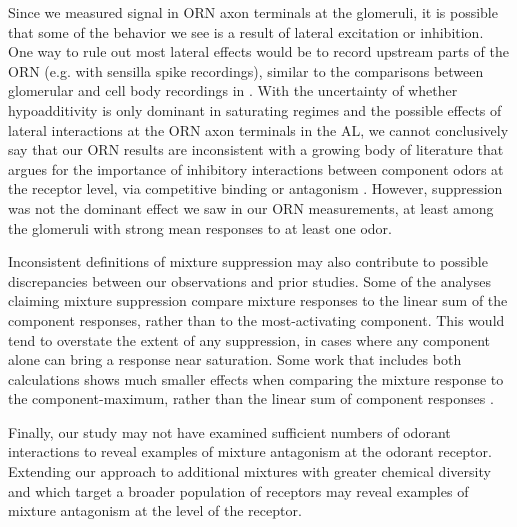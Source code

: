 \documentclass[12pt]{caltech_thesis}
\renewcommand{\cite}{{ }\autocite}
\begin{document}
\begin{refsection}
Since we measured signal in ORN axon terminals at the glomeruli, it is possible that some of the behavior we see is a result of lateral excitation or inhibition.
One way to rule out most lateral effects would be to record upstream parts of the ORN (e.g. with sensilla spike recordings), similar to the comparisons between glomerular and cell body recordings in \textcite{Zak2020}.
With the uncertainty of whether hypoadditivity is only dominant in saturating regimes and the possible effects of lateral interactions at the ORN axon terminals in the AL, we cannot conclusively say that our ORN results are inconsistent with a growing body of literature that argues for the importance of inhibitory interactions between component odors at the receptor level, via competitive binding or antagonism\cite{CompetitiveBinding, MurthyAntagonism, Zak2020}.
However, suppression was not the dominant effect we saw in our ORN measurements, at least among the glomeruli with strong mean responses to at least one odor.

Inconsistent definitions of mixture suppression may also contribute to possible discrepancies between our observations and prior studies.
Some of the analyses claiming mixture suppression compare mixture responses to the linear sum of the component responses, rather than to the most-activating component.
This would tend to overstate the extent of any suppression, in cases where any component alone can bring a response near saturation.
Some work that includes both calculations shows much smaller effects when comparing the mixture response to the component-maximum, rather than the linear sum of component responses\cite{Zak2020}.

Finally, our study may not have examined sufficient numbers of odorant interactions to reveal examples of mixture antagonism at the odorant receptor.
Extending our approach to additional mixtures with greater chemical diversity and which target a broader population of receptors may reveal examples of mixture antagonism at the level of the receptor.


\end{refsection}
\end{document}
